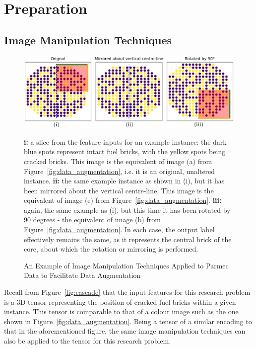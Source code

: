 \section{Preparation} \label{data}

\subsection{Image Manipulation Techniques} \label{manipulation}

\begin{figure}[h]
	\centering
	\includegraphics[scale=0.5]{Figures/parmec_augmentation.png}
	\caption{An Example of Image Manipulation Techniques Applied to Parmec Data to Facilitate Data Augmentation} {\textbf{i:} a slice from the feature inputs for an example instance: the dark blue spots represent intact fuel bricks, with the yellow spots being cracked bricks. This image is the equivalent of image (a) from Figure~\ref{fig:data_augmentation}, i.e. it is an original, unaltered instance. \textbf{ii:} the same example instance as shown in (i), but it has been mirrored about the vertical centre-line. This image is the equivalent of image (e) from Figure~\ref{fig:data_augmentation}. \textbf{iii:} again, the same example as (i), but this time it has been rotated by 90 degrees - the equivalent of image (b) from Figure~\ref{fig:data_augmentation}. In each case, the output label effectively remains the same, as it represents the central brick of the core, about which the rotation or mirroring is performed.}
	\label{fig:parmec_augmentation}
\end{figure}

Recall from Figure~\ref{fig:cascade} that the input features for this research problem is a 3D tensor representing the position of cracked fuel bricks within a given instance. This tensor is comparable to that of a colour image such as the one shown in Figure~\ref{fig:data_augmentation}. Being a tensor of a similar encoding to that in the aforementioned figure, the same image manipulation techniques can also be applied to the tensor for this research problem.
\\

